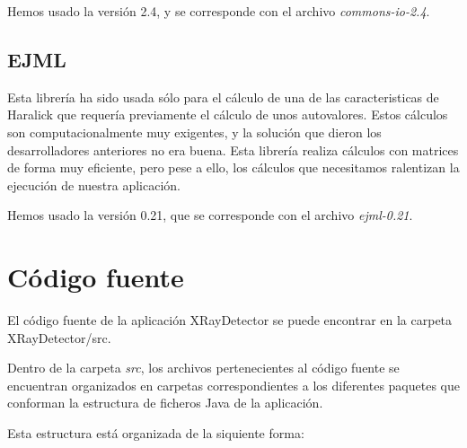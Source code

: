 Hemos usado la versión 2.4, y se corresponde con el archivo \textit{commons-io-2.4}.

\subsection{EJML}
Esta librería ha sido usada sólo para el cálculo de una de las caracteristicas de Haralick que requería previamente el cálculo de unos autovalores. Estos cálculos son computacionalmente muy exigentes, y la solución que dieron los desarrolladores anteriores no era buena. Esta librería realiza cálculos con matrices de forma muy eficiente, pero pese a ello, los cálculos que necesitamos ralentizan la ejecución de nuestra aplicación.

Hemos usado la versión 0.21, que se corresponde con el archivo \textit{ejml-0.21}.


\section{Código fuente}
El código fuente de la aplicación XRayDetector se puede encontrar en la carpeta XRayDetector/src.

Dentro de la carpeta \textit{src}, los archivos pertenecientes al código fuente se encuentran organizados en carpetas correspondientes a los diferentes paquetes que conforman la estructura de ficheros Java de la aplicación.

Esta estructura está organizada de la siquiente forma:

